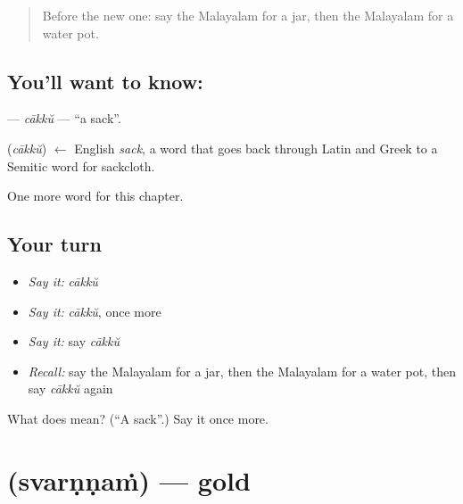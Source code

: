 \label{lesson:ML-C330-cakku}



\begin{quote}
Before the new one: say the Malayalam for a jar, then the Malayalam for a water pot.
\end{quote}

\subsection*{You'll want to know: }
\textbf{} — \emph{cākkŭ} — \textquotedblleft{}a sack\textquotedblright{}.

\begin{cousinweb}
\textbf{} (\emph{cākkŭ}) $\leftarrow$ English \emph{sack}, a word that goes back through Latin and Greek to a Semitic word for sackcloth.
\end{cousinweb}

\begin{grammarlens}[title={What you've built}]
One more word for this chapter.
\end{grammarlens}

\subsection*{Your turn}
\begin{itemize}
\raggedright
  \item \emph{Say it:} \emph{cākkŭ}
  \item \emph{Say it:} \emph{cākkŭ}, once more
  \item \emph{Say it:} say \emph{cākkŭ}
  \item \emph{Recall:} say the Malayalam for a jar, then the Malayalam for a water pot, then say \emph{cākkŭ} again
\end{itemize}

\begin{tcolorbox}[breakable,colback=teal!4,colframe=teal!35!black,title={Before you move on}]
What does  mean? (\textquotedblleft{}A sack\textquotedblright{}.) Say it once more.
\end{tcolorbox}
\section[\texorpdfstring{\ml{സ്വർണ്ണം} (svarṇṇaṁ)}{സ്വർണ്ണം (svarṇṇaṁ)}]{ (svarṇṇaṁ) — gold}

\label{lesson:ML-C330-svarnnam}



